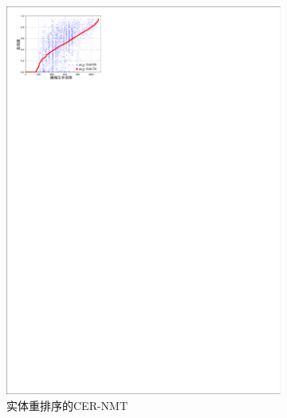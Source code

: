 \begin{figure}[!htbp]
\begin{subfigure}[b]{0.45\textwidth}
      \includegraphics[width=\textwidth]{Img/fig_4_fidelity_cer_selforder.pdf}
      \caption{实体重排序的CER-NMT}
      \label{fig:4_fidelity_cer_selforder}
    \end{subfigure}%
    ~%
    \begin{subfigure}[b]{0.45\textwidth}

\end{subfigure}
\end{figure}
